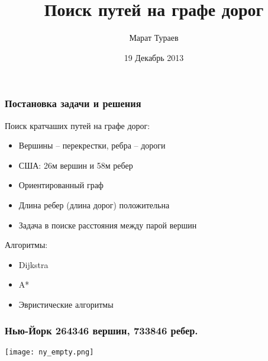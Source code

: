 \documentclass[10pt, pdf,utf8,russian]{beamer}
\title[Поиск путей на графе дорог]{Поиск путей на графе дорог} %
\author{Марат Тураев}
\institute[СПбАУ] %
{Руководитель: Алексей Гуревич\\СПбАУ МИТ SE}
\date{19 Декабрь 2013} %
\begin{document}
\begin{frame}
\titlepage %
\end{frame}



\begin{frame}
\frametitle{Постановка задачи и решения}
Поиск кратчаших путей на графе дорог:
\begin{itemize}
	\item Вершины -- перекрестки, ребра -- дороги
	\item США: 26м вершин и 58м ребер
	\item Ориентированный граф
	\item Длина ребер (длина дорог) положительна
	\item Задача в поиске расстояния между парой вершин
\end{itemize}
Алгоритмы:
\begin{itemize}
	\item Dijkstra
	\item A*
	\item Эвристические алгоритмы
\end{itemize}
\end{frame}

\begin{frame}
\frametitle{Нью-Йорк 264346 вершин, 733846 ребер.}
\begin{center}
	\texttt{[image: ny\_empty.png]}
\end{center} 
\end{frame}
\end{document}
